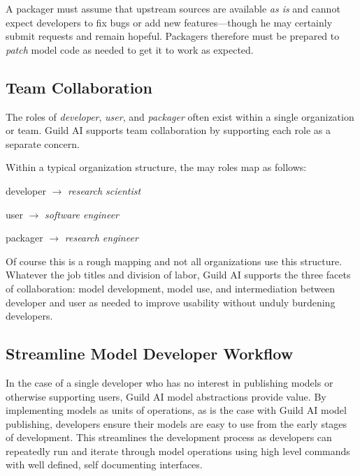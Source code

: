 \documentclass{article}
\begin{document}
A packager must assume that upstream sources are available \emph{as
  is} and cannot expect developers to fix bugs or add new
features---though he may certainly submit requests and remain
hopeful. Packagers therefore must be prepared to \emph{patch} model
code as needed to get it to work as expected.

\iffalse
Guild AI provides various means of patching model source to support
packagers in this role. Section~\ref{sec:patching} describes patching
methods.
\fi

\subsection{Team Collaboration}

The roles of \emph{developer}, \emph{user}, and \emph{packager} often
exist within a single organization or team. Guild AI supports team
collaboration by supporting each role as a separate concern.

Within a typical organization structure, the may roles map as follows:

\setlength{\parindent}{1em}
developer $\rightarrow$ \emph{research scientist}

user $\rightarrow$ \emph{software engineer}

packager $\rightarrow$ \emph{research engineer}
\setlength{\parindent}{0em}

Of course this is a rough mapping and not all organizations use this
structure. Whatever the job titles and division of labor, Guild AI
supports the three facets of collaboration: model development, model
use, and intermediation between developer and user as needed to
improve usability without unduly burdening developers.

\subsection{Streamline Model Developer Workflow}
\label{sec:streamline-workflow}

In the case of a single developer who has no interest in publishing
models or otherwise supporting users, Guild AI model abstractions
provide value. By implementing models as units of operations, as is
the case with Guild AI model publishing, developers ensure their
models are easy to use from the early stages of development. This
streamlines the development process as developers can repeatedly run
and iterate through model operations using high level commands with
well defined, self documenting interfaces.
\end{document}
